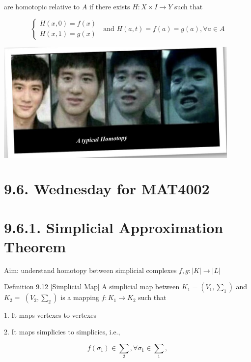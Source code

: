 are homotopic relative to \(A\) if there exists \(H : X \times  I \rightarrow  Y\) such that

\[
\left\{  {\begin{array}{l} H\left( {x,0}\right)  = f\left( x\right) \\  H\left( {x,1}\right)  = g\left( x\right)  \end{array}\;\text{ and }H\left( {a,t}\right)  = f\left( a\right)  = g\left( a\right) ,\forall a \in  A}\right.
\]

\begin{center}
\includegraphics[max width=0.9\textwidth]{images/bo_d2bcsrref24c73avs720_92_438_690_1088_542_0.jpg}
\end{center}
\hspace*{3em} 

\section*{9.6. Wednesday for MAT4002}

\section*{9.6.1. Simplicial Approximation Theorem}

Aim: understand homotopy between simplicial complexes \(f,g : \left| K\right|  \rightarrow  \left| L\right|\)

Definition 9.12 [Simplicial Map] A simplicial map between \({K}_{1} = \left( {{V}_{1},{\sum }_{1}}\right)\) and \({K}_{2} =\)  \(\left( {{V}_{2},{\sum }_{2}}\right)\) is a mapping \(f : {K}_{1} \rightarrow  {K}_{2}\) such that

1. It maps vertexes to vertexes

2. It maps simplicies to simplicies, i.e.,

\[
f\left( {\sigma }_{1}\right)  \in  {\sum }_{2},\forall {\sigma }_{1} \in  {\sum }_{1},
\]

